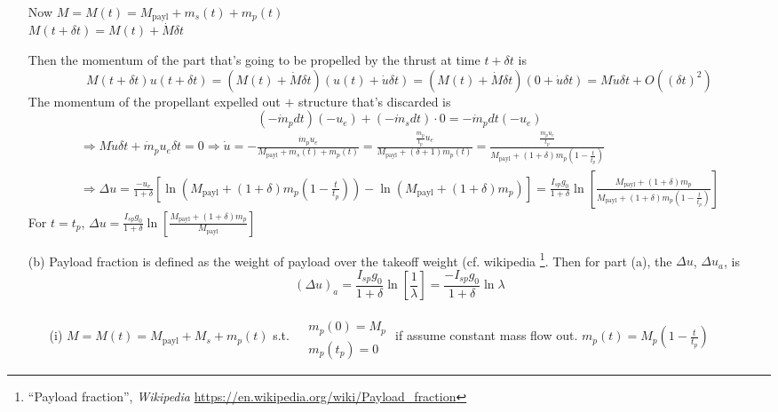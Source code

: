\documentclass[10pt]{amsart}
\begin{document}
\begin{multicols*}{2}
\begin{enumerate}
Now $M=M(t) = M_{\text{payl}} + m_s(t) + m_p(t)$ \\
$M(t+\delta t) = M(t) + \dot{M} \delta t$

Then the momentum of the part that's going to be propelled by the thrust at time $t+\delta t$ is 
\[
M(t+\delta t)u(t+\delta t) = (M(t) + \dot{M} \delta t)(u(t) + \dot{u} \delta t) = (M(t) + \dot{M} \delta t)(0 + \dot{u} \delta t) = M\dot{u} \delta t+ O((\delta t)^2)
\]
The momentum of the propellant expelled out $+$ structure that's discarded is 
\[
(-\dot{m}_p dt)(-u_e) + (-\dot{m}_s dt)\cdot 0 = -\dot{m}_p dt(-u_e)
\]
\[
\begin{gathered}
  \Longrightarrow M \dot{u} \delta t + \dot{m}_p u_e \delta t = 0 \Longrightarrow \dot{u} = -\frac{\dot{m}_p u_e}{ M_{\text{payl}} + m_s(t) + m_p(t) } = \frac{ \frac{m_p}{t_p} u_e }{ M_{\text{payl}} + (\delta + 1) m_p(t) } = \frac{ \frac{m_p u_e}{t_p } }{ M_{\text{payl} } + (1+ \delta )m_p (1-  \frac{t}{t_p} ) }  \\
  \Longrightarrow \Delta u = \frac{-u_e}{1+ \delta } \left[ \ln{ ( M_{\text{payl}} + (1+\delta)m_p (1- \frac{t}{t_p} ) ) } - \ln{ (M_{\text{payl} } + (1+ \delta )m_p ) } \right] = \frac{I_{sp}g_0}{1+\delta } \ln{ \left[ \frac{ M_{\text{payl} } + (1+ \delta ) m_p }{ M_{\text{payl} } + (1+ \delta )m_p (1 - \frac{t}{t_p } ) } \right] }
\end{gathered}
\]
For $t=t_p$, $\Delta u = \frac{I_{sp}g_0}{1+ \delta } \ln{ \left[ \frac{ M_{\text{payl}} + (1+\delta ) m_p }{ M_{\text{payl}} } \right] }$

\item[(b)] Payload fraction is defined as the weight of payload over the takeoff weight (cf. wikipedia \footnote{ ``Payload fraction'',  \emph{Wikipedia} \url{https://en.wikipedia.org/wiki/Payload_fraction}}. Then for part (a), the $\Delta u$, $\Delta u_a$, is 
\[
(\Delta u)_a  = \frac{ I_{sp} g_0 }{ 1+\delta } \ln{ \left[ \frac{1}{\lambda} \right] } = \frac{-I_{sp} g_0 }{ 1 + \delta } \ln{\lambda}
\]
\begin{enumerate} 
\item[(i)] $M = M(t) = M_{\text{payl}} + M_s + m_p(t)$ s.t. $\begin{aligned} & \quad \\
  & m_p(0) = M_p \\
  & m_p(t_p) = 0 \end{aligned}$ if assume constant mass flow out.  $m_p(t) = M_p(1- \frac{t}{t_p})$


\end{enumerate}
\end{enumerate}
\end{multicols*}
\end{document}

